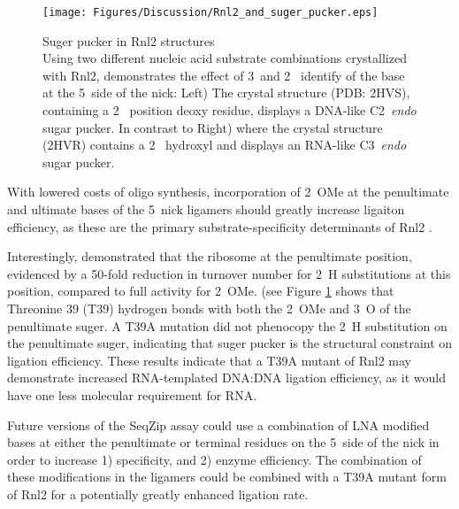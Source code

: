     \begin{figure} %
      \centering 
      \texttt{[image: Figures/Discussion/Rnl2\_and\_suger\_pucker.eps]}
      \caption[Suger pucker in Rnl2 structures]
      {Suger pucker in Rnl2 structures \\[0.25cm]
        Using two different nucleic acid substrate combinations crystallized with Rnl2, \citet{Nandakumar2006} demonstrates the effect of 3\textprime~and 2\textprime~ identify of the base at the 5\textprime~side of the nick: Left) The crystal structure (PDB: 2HVS), containing a 2\textprime~ position deoxy residue, displays a DNA-like C2\textprime~\textit{endo} sugar pucker. In contrast to Right) where the crystal structure (2HVR) contains a 2\textprime~ hydroxyl and displays an RNA-like C3\textprime~\textit{endo} sugar pucker.
        }
        \label{Disc:fig:Rnl2 and suger pucker}
        \end{figure}

    With lowered costs of oligo synthesis, incorporation of 2\textprime~OMe at the penultimate and ultimate bases of the 5\textprime~nick ligamers should greatly increase ligaiton efficiency, as these are the primary substrate-specificity determinants of Rnl2 \citep{Nandakumar2004a, Nandakumar2006}.

    Interestingly, \citet{Nandakumar2004a} demonstrated that the ribosome at the penultimate position, evidenced by a 50-fold reduction in turnover number for 2\textprime~H substitutions at this position, compared to full activity for 2\textprime~OMe. \citet{Nandakumar2006} (see Figure \ref{Disc:fig:Rnl2 and suger pucker} shows that Threonine 39 (T39) hydrogen bonds with both the 2\textprime~OMe and 3\textprime~O of the penultimate suger. A T39A mutation did not phenocopy the 2\textprime~H substitution on the penultimate suger, indicating that suger pucker is the structural constraint on ligation efficiency. These results indicate that a T39A mutant of Rnl2 may demonstrate increased RNA-templated DNA:DNA ligation efficiency, as it would have one less molecular requirement for RNA.

    Future versions of the SeqZip assay could use a combination of LNA modified bases \citep{You2006} at either the penultimate or terminal residues on the 5\textprime~side of the nick in order to increase 1) specificity, and 2) enzyme efficiency. The combination of these modifications in the ligamers could be combined with a T39A mutant form of Rnl2 for a potentially greatly enhanced ligation rate.

